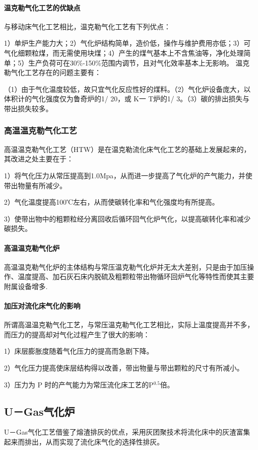 \documentclass[10pt,openany]{ctexbook}
\begin{document}
\paragraph{温克勒气化工艺的优缺点}
与移动床气化工艺相比，温克勒气化工艺有下列优点：\par
1）单炉生产能力大；2）气化炉结构简单，造价低，操作与维护费用亦低；3）可气化细颗粒煤，而无需使用块煤；4）产生的煤气基本上不含焦油等，净化处理简单；5）生产负荷可在30\%-150\%范围内调节，且对气化效率基本上无影响。
温克勒气化工艺存在的问题主要有：\par
（1）由于气化温度较低，故只宜气化反应性好的煤料。（2）气化炉设备庞大，以体积计的气化强度仅为鲁奇炉的1/ 20，或 K一 T炉的1/ 3。（3）碳的排出损失与带出损失较多。
\subsubsection{高温温克勒气化工艺}
高温温克勒气化工艺（HTW）是在温克勒流化床气化工艺的基础上发展起来的，其改进之处主要在于：\par
1）将气化压力从常压提高到1.0Mpa，从而进一步提高了气化炉的产气能力，并使带出物量有所减少。\par
2）气化温度提高100℃左右，从而使碳转化率和气化强度均有所提高。\par
3）使带出物中的粗颗粒经分离回收后循环回气化炉气化，以提高碳转化率和减少碳损失。
\paragraph{高温温克勒气化炉}
高温温克勒气化炉的主体结构与常压温克勒气化炉并无太大差别，只是由于加压操作、温度提高、加石灰石床内脱硫及粗颗粒带出物循环回炉气化等特性而使其主要附属设备增多.
\paragraph{加压对流化床气化的影响}
所谓高温温克勒气化工艺，与常压温克勒气化工艺相比，实际上温度提高并不多，而压力的提高却对气化过程产生了很大的影响：\par
1）床层膨胀度随着气化压力的提高而急剧下降。\par
2）气化压力提高使床层结构得以改善，带出物量与带出颗粒的尺寸有所减小。\par
3）压力为 P 时的产气能力为常压流化床工艺的P$^{0.5}$倍。
\subsection{U－Gas气化炉}
U－Gas气化工艺借鉴了熔渣排灰的优点，采用灰团聚技术将流化床中的灰渣富集起来而排出，从而实现了流化床气化的选择性排灰。
\end{document}
